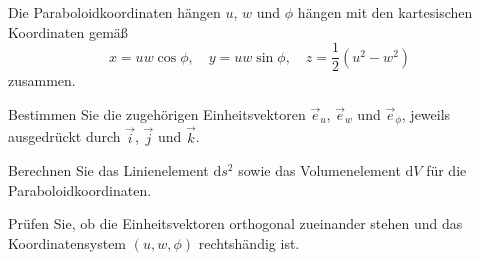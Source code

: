 \begin{atiTask}[
  title = Paraboloidkoordinaten
]

Die Paraboloidkoordinaten hängen $u$, $w$ und $\phi$ hängen mit den kartesischen Koordinaten gemäß
\[
x=uw\cos \phi,\quad y=uw\sin \phi,\quad z=\frac{1}{2}(u^2-w^2)
\]
zusammen.
\begin{atiSubtasks}
	\item Bestimmen Sie die zugehörigen Einheitsvektoren $\vec{e}_u$, $\vec{e}_w$ und $\vec{e}_\phi$, jeweils ausgedrückt durch $\vec{i}$, $\vec{j}$ und $\vec{k}$.
	\item Berechnen Sie das Linienelement $\mathrm{d} s^2$ sowie das Volumenelement $\mathrm{d} V$ für die Paraboloidkoordinaten.
	\item Prüfen Sie, ob  die Einheitsvektoren orthogonal zueinander stehen und das Koordinatensystem $(u,w,\phi)$ rechtshändig ist.
\end{atiSubtasks}


\end{atiTask}

% 	
